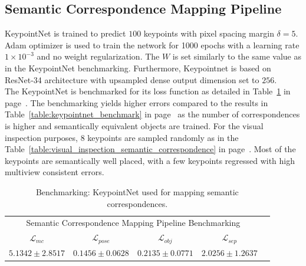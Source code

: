 \subsection{Semantic Correspondence Mapping Pipeline}

KeypointNet is trained to predict $100$ keypoints with pixel spacing margin $\delta = 5$. Adam optimizer is used to train
the network for 1000 epochs with a learning rate $1 \times 10^{-3}$ and no weight regularization. The $W$ is set similarly to the same value as in the KeypointNet benchmarking. Furthermore, Keypointnet is based on \ac{ResNet}-34 architecture with upsampled dense output dimension set to $256$.\\

The KeypointNet is benchmarked for its loss function as detailed in  Table~\ref{table:benchmark_semantic_correspondence} in page~\pageref{table:benchmark_semantic_correspondence}. The benchmarking yields higher errors
compared to the results in Table~\ref{table:keypointnet_benchmark} in page~\pageref{table:keypointnet_benchmark} as the number of correspondences is higher and semantically equivalent objects are trained. For the visual inspection purposes, $8$  keypoints are sampled randomly as in the Table~\ref{table:visual_inspection_semantic_correspondence}
in page~\pageref{table:visual_inspection_semantic_correspondence}. Most of the keypoints are semantically well placed, with a few keypoints regressed with high multiview consistent errors.\\


\begin{table}[htb]
    \centering
    \begin{tabular}{lcccc}
        \hline
        \multicolumn{4}{c}{Semantic Correspondence Mapping Pipeline Benchmarking}                                                                                              \\
        \multicolumn{1}{c}{$\mathcal{L}_{mc}$}  & \multicolumn{1}{c}{$\mathcal{L}_{pose}$} & \multicolumn{1}{c}{$\mathcal{L}_{obj}$} & \multicolumn{1}{c}{$\mathcal{L}_{sep}$} \\ \hline
        \multicolumn{1}{c}{$5.1342 \pm 2.8517$} & \multicolumn{1}{c}{$0.1456 \pm 0.0628$}  & \multicolumn{1}{c}{$0.2135 \pm 0.0771$} & \multicolumn{1}{c}{$2.0256 \pm 1.2637$} \\ \hline
    \end{tabular}
    \caption{Benchmarking: KeypointNet used for mapping semantic correspondences.}
    \label{table:benchmark_semantic_correspondence}
\end{table}


